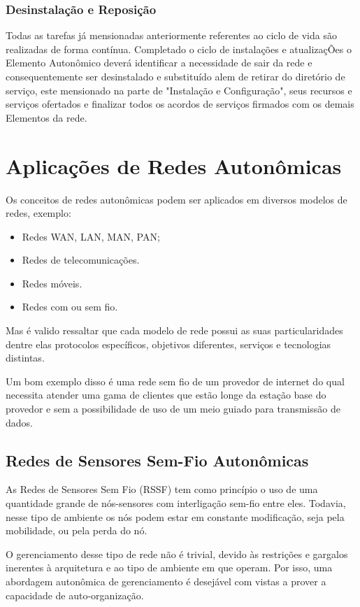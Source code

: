 \documentclass[11pt,twoside]{article}
\begin{document}
\subsubsection{Desinstalação e Reposição}
Todas as tarefas já mensionadas anteriormente referentes ao ciclo de vida são realizadas de forma contínua. Completado o ciclo de instalações e atualizaçÕes o Elemento Autonômico deverá identificar a necessidade de sair da rede e consequentemente ser desinstalado e substituído alem de retirar do diretório de serviço, este mensionado na parte de "Instalação e Configuração", seus recursos e serviços ofertados e finalizar todos os acordos de serviços firmados com os demais Elementos da rede.

\section{Aplicações de Redes Autonômicas}
Os conceitos de redes autonômicas podem ser aplicados em diversos modelos de redes, exemplo:
\begin{itemize}
	\item Redes WAN, LAN, MAN, PAN;
	\item Redes de telecomunicações.
	\item Redes móveis.
	\item Redes com ou sem fio.
\end{itemize}

Mas é valido ressaltar que cada modelo de rede possui as suas particularidades dentre elas protocolos específicos, objetivos diferentes, serviços e tecnologias distintas. 

Um bom exemplo disso é uma rede sem fio de um provedor de internet do qual necessita atender uma gama de clientes que estão longe da estação base do provedor e sem a possibilidade de uso de um meio guiado para transmissão de dados.

\subsection{Redes de Sensores Sem-Fio Autonômicas}
As Redes de Sensores Sem Fio (RSSF) tem como princípio o uso de uma quantidade grande de nós-sensores com interligação sem-fio entre eles. Todavia, nesse tipo de ambiente os nós podem estar em constante modificação, seja pela mobilidade, ou pela perda do nó.

O gerenciamento desse tipo de rede não é trivial, devido às restrições e gargalos inerentes à arquitetura e ao tipo de ambiente em que operam. Por isso, uma abordagem autonômica de gerenciamento é desejável com vistas a prover a capacidade de auto-organização.
\end{document}
